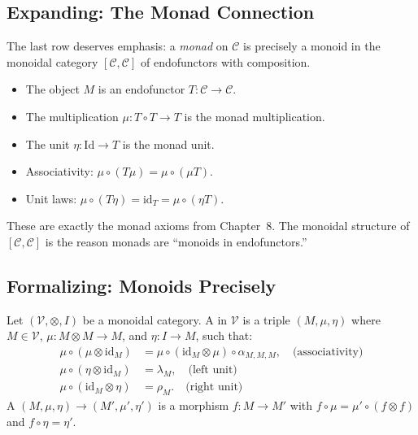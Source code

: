 \subsection{Expanding: The Monad Connection}

The last row deserves emphasis: a \emph{monad} on $\mathcal{C}$ is precisely a
monoid in the monoidal category $[\mathcal{C}, \mathcal{C}]$ of endofunctors
with composition.

\begin{itemize}
  \item The object $M$ is an endofunctor $T : \mathcal{C} \to \mathcal{C}$.
  \item The multiplication $\mu : T \circ T \to T$ is the monad multiplication.
  \item The unit $\eta : \mathrm{Id} \to T$ is the monad unit.
  \item Associativity: $\mu \circ (T\mu) = \mu \circ (\mu T)$.
  \item Unit laws: $\mu \circ (T\eta) = \mathrm{id}_T = \mu \circ (\eta T)$.
\end{itemize}

These are exactly the monad axioms from Chapter~8. The monoidal structure of
$[\mathcal{C}, \mathcal{C}]$ is the reason monads are ``monoids in endofunctors.''

\subsection{Formalizing: Monoids Precisely}

\begin{definition}
Let $(\mathcal{V}, \otimes, I)$ be a monoidal category. A  in
$\mathcal{V}$ is a triple $(M, \mu, \eta)$ where $M \in \mathcal{V}$,
$\mu : M \otimes M \to M$, and $\eta : I \to M$, such that:
\begin{align*}
  \mu \circ (\mu \otimes \mathrm{id}_M) &= \mu \circ (\mathrm{id}_M \otimes \mu)
  \circ \alpha_{M,M,M},
  \quad \text{(associativity)} \\
  \mu \circ (\eta \otimes \mathrm{id}_M) &= \lambda_M,
  \quad \text{(left unit)} \\
  \mu \circ (\mathrm{id}_M \otimes \eta) &= \rho_M.
  \quad \text{(right unit)}
\end{align*}
A  $(M, \mu, \eta) \to (M', \mu', \eta')$ is a
morphism $f : M \to M'$ with $f \circ \mu = \mu' \circ (f \otimes f)$ and
$f \circ \eta = \eta'$.
\end{definition}

